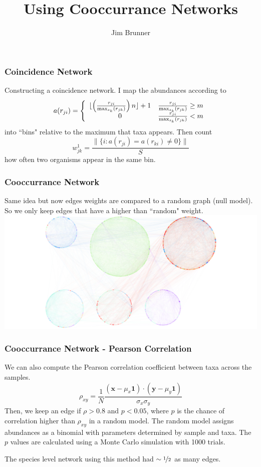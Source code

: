 \documentclass{beamer}
\author[Brunner]{Jim Brunner}
\institute[LANL]{Los Alamos National Laboratory}
\title{Using Cooccurrance Networks}
\date{}
\newcommand{\nhalf}{\nicefrac{1}{2}}
\renewcommand{\b}{\bm}
\begin{document}
\begin{frame}
\titlepage
\end{frame}
\begin{frame}
\frametitle{Coincidence Network}
Constructing a coincidence network.
I map the abundances according to
\[
a(r_{ji})  = \left\{
\begin{array}{c c}
\lfloor\left(\frac{r_{ji}}{\max_{s_k}(r_{jk})}\right) n \rfloor + 1 &  \frac{r_{ji}}{\max_{s_k}(r_{jk})} \geq m \\
0 & \frac{r_{ji}}{\max_{s_k}(r_{jk})} < m
\end{array}
\right.
\]
into ``bins" relative to the maximum that taxa appears. Then count 
\[
w^1_{jk} = \frac{\|\{i: a(r_{ji}) = a(r_{ki}) \neq 0\} \|}{S}
\]
how often two organisms appear in the same bin.
\end{frame}
\begin{frame}
\frametitle{Cooccurrance Network}
Same idea but now edges weights are compared to a random graph (null model). 
So we only keep edges that have a higher than ``random" weight.
\includegraphics[scale = 0.2]{../old_networks/june20/june20_species.png}
\end{frame}
\begin{frame}
\frametitle{Cooccurrance Network - Pearson Correlation}
We can also compute the Pearson correlation coefficient between taxa across the samples. 
\[
\rho_{xy} = \frac{1}{N}\frac{(\b{x}- \mu_x\b{1}) \cdot (\b{y} - \mu_y\b{1})}{\sigma_x \sigma_y}
\]
Then, we keep an edge if $\rho > 0.8$ and $p< 0.05$, where $p$ is the chance of correlation higher than $\rho_{xy}$ in a random model. The random model assigns abundances as a binomial with parameters determined by sample and taxa. The $p$ values are calculated using a Monte Carlo simulation with 1000 trials. 

The species level network using this method had $\sim \nhalf$ as many edges.
\end{frame}
\end{document}
